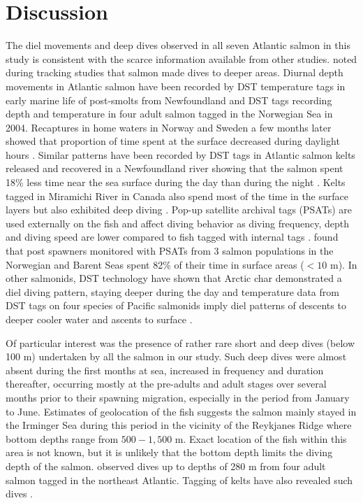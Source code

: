 \section{Discussion}
\label{Dis}
The diel movements and deep dives observed in all seven Atlantic salmon in this study is consistent with the scarce information available from other studies. 
\cite{Westerberg1982a} noted during tracking studies that salmon made dives to deeper areas. 
Diurnal depth movements in Atlantic salmon have been recorded by DST temperature tags in early marine life of post-smolts from Newfoundland \citep{Reddin2006} and DST tags recording depth and temperature in four adult salmon tagged in the Norwegian Sea in 2004. 
Recaptures in home waters in Norway and Sweden a few months later showed that proportion of time spent at the surface decreased during daylight hours \citep{Holm2006}. 
Similar patterns have been recorded by DST tags in Atlantic salmon kelts released and recovered in a Newfoundland river showing that the salmon spent 18\% less time near the sea surface during the day than during the night \citep{Reddin2011}. 
Kelts tagged in Miramichi River in Canada also spend most of the time in the surface layers but also exhibited deep diving \citep{Strom2017}. 
Pop-up satellite archival tags (PSATs) are used externally on the fish and affect diving behavior as diving frequency, depth and diving speed are lower compared to fish tagged with internal tags \citep{Hedger2016}. 
\citet{Hedger2017} found that post spawners monitored with PSATs from 3 salmon populations in the Norwegian and Barent Seas spent 82\% of their time in surface areas ($<10$ m).
In other salmonids, DST technology have shown that Arctic char demonstrated a diel diving pattern, staying deeper during the day \citep{Rikardsen2007} and temperature data from DST tags on four species of Pacific salmonids imply diel patterns of descents to deeper cooler water and ascents to surface \citep{Walker2000}.

Of particular interest was the presence of rather rare short and deep dives (below 100 m) undertaken by all the salmon in our study. 
Such deep dives were almost absent during the first months at sea, increased in frequency and duration thereafter, occurring mostly at the pre-adults and adult stages over several months prior to their spawning migration, especially in the period from January to June.  
Estimates of geolocation of the fish suggests the salmon mainly stayed in the Irminger Sea during this period \citep{Gudjonsson2015} in the vicinity of the Reykjanes Ridge where bottom depths range from $500 - 1,500$ m.  
Exact location of the fish within this area is not known, but it is unlikely that the bottom depth limits the diving depth of the salmon. 
\cite{Holm2006} observed dives up to depths of 280 m from four adult salmon tagged in the northeast Atlantic. 
Tagging of kelts have also revealed such dives \citep{Reddin2011,Chittenden2013,Strom2017}.

